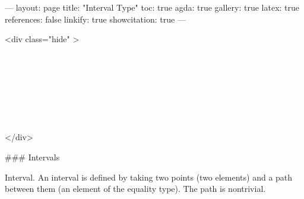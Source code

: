 ---
layout: page
title: "Interval Type"
toc: true
agda: true
gallery: true
latex: true
references: false
linkify: true
showcitation: true
---

<div class="hide" >
\begin{code}%
\>[0]\AgdaSymbol{\{-\#}\AgdaSpace{}%
\AgdaSpace{}%
\AgdaSpace{}%
\AgdaSymbol{\#-\}}\<%
\\
\>[0]\AgdaSpace{}%
\AgdaSpace{}%
\<%
\\
\>[0]\AgdaSpace{}%
\AgdaSpace{}%
\<%
\\
%
\\[\AgdaEmptyExtraSkip]%
\>[0]\AgdaSpace{}%
\AgdaSpace{}%
\<%
\\
\>[0]\AgdaSpace{}%
\AgdaSpace{}%
\<%
\\
\>[0]\AgdaSpace{}%
\AgdaSpace{}%
\<%
\end{code}
</div>

### Intervals

Interval. An interval is defined by taking two points (two elements) and a path
between them (an element of the equality type). The path is nontrivial.

